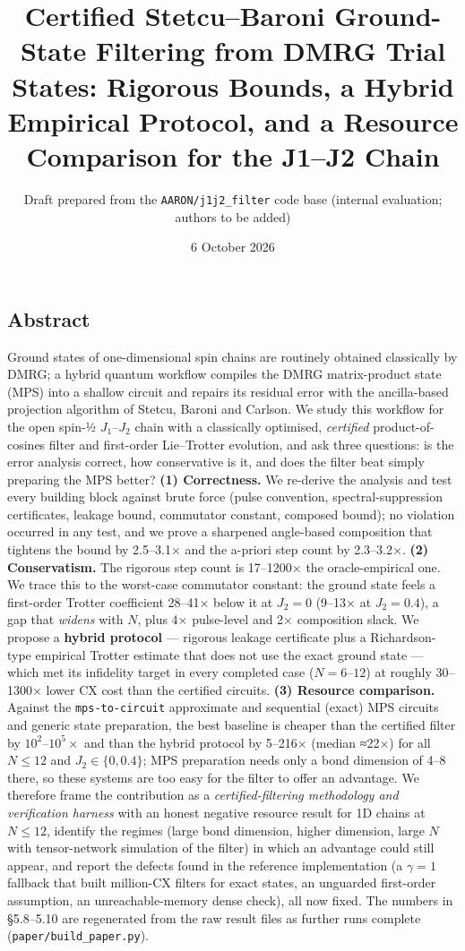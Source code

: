 \documentclass[
]{article}
\title{Certified Stetcu--Baroni Ground-State Filtering from DMRG Trial
States: Rigorous Bounds, a Hybrid Empirical Protocol, and a Resource
Comparison for the J1--J2 Chain}
\author{Draft prepared from the \texttt{AARON/j1j2\_filter} code base
(internal evaluation; authors to be added)}
\date{6 October 2026}
\begin{document}
\maketitle

\hypertarget{abstract}{%
\subsection{Abstract}\label{abstract}}

Ground states of one-dimensional spin chains are routinely obtained
classically by DMRG; a hybrid quantum workflow compiles the DMRG
matrix-product state (MPS) into a shallow circuit and repairs its
residual error with the ancilla-based projection algorithm of Stetcu,
Baroni and Carlson. We study this workflow for the open spin-½
\(J_1\)--\(J_2\) chain with a classically optimised, \emph{certified}
product-of-cosines filter and first-order Lie--Trotter evolution, and
ask three questions: is the error analysis correct, how conservative is
it, and does the filter beat simply preparing the MPS better?
\textbf{(1) Correctness.} We re-derive the analysis and test every
building block against brute force (pulse convention,
spectral-suppression certificates, leakage bound, commutator constant,
composed bound); no violation occurred in any test, and we prove a
sharpened angle-based composition that tightens the bound by 2.5--3.1×
and the a-priori step count by 2.3--3.2×. \textbf{(2) Conservatism.} The
rigorous step count is 17--1200× the oracle-empirical one. We trace this
to the worst-case commutator constant: the ground state feels a
first-order Trotter coefficient 28--41× below it at \(J_2=0\) (9--13× at
\(J_2=0.4\)), a gap that \emph{widens} with \(N\), plus 4× pulse-level
and 2× composition slack. We propose a \textbf{hybrid protocol} ---
rigorous leakage certificate plus a Richardson-type empirical Trotter
estimate that does not use the exact ground state --- which met its
infidelity target in every completed case (\(N=6\)--\(12\)) at roughly
30--1300× lower CX cost than the certified circuits. \textbf{(3)
Resource comparison.} Against the \texttt{mps-to-circuit} approximate
and sequential (exact) MPS circuits and generic state preparation, the
best baseline is cheaper than the certified filter by
\(10^{2}\)--\(10^{5}\times\) and than the hybrid protocol by 5--216×
(median ≈22×) for all \(N\le12\) and \(J_2\in\{0,0.4\}\); MPS
preparation needs only a bond dimension of 4--8 there, so these systems
are too easy for the filter to offer an advantage. We therefore frame
the contribution as a \emph{certified-filtering methodology and
verification harness} with an honest negative resource result for 1D
chains at \(N\le12\), identify the regimes (large bond dimension, higher
dimension, large \(N\) with tensor-network simulation of the filter) in
which an advantage could still appear, and report the defects found in
the reference implementation (a \(\gamma=1\) fallback that built
million-CX filters for exact states, an unguarded first-order
assumption, an unreachable-memory dense check), all now fixed. The
numbers in §5.8--5.10 are regenerated from the raw result files as
further runs complete (\texttt{paper/build\_paper.py}).
\end{document}
